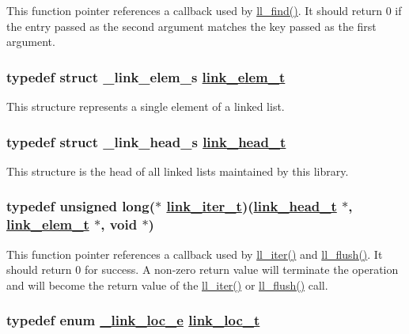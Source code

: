 This function pointer references a callback used by \hyperlink{group__dbprim__link_a9}{ll\_\-find()}. It should return 0 if the entry passed as the second argument matches the key passed as the first argument. \hypertarget{group__dbprim__link_a1}{
\subsubsection[link\_\-elem\_\-t]{\setlength{\rightskip}{0pt plus 5cm}typedef struct \_\-link\_\-elem\_\-s \hyperlink{dbprim_8h_a1}{link\_\-elem\_\-t}}}
\label{group__dbprim__link_a1}


This structure represents a single element of a linked list. \hypertarget{group__dbprim__link_a0}{
\subsubsection[link\_\-head\_\-t]{\setlength{\rightskip}{0pt plus 5cm}typedef struct \_\-link\_\-head\_\-s \hyperlink{dbprim_8h_a0}{link\_\-head\_\-t}}}
\label{group__dbprim__link_a0}


This structure is the head of all linked lists maintained by this library. \hypertarget{group__dbprim__link_a2}{
\subsubsection[link\_\-iter\_\-t]{\setlength{\rightskip}{0pt plus 5cm}typedef unsigned long($\ast$ \hyperlink{dbprim_8h_a2}{link\_\-iter\_\-t})(\hyperlink{dbprim_8h_a0}{link\_\-head\_\-t} $\ast$, \hyperlink{dbprim_8h_a1}{link\_\-elem\_\-t} $\ast$, void $\ast$)}}
\label{group__dbprim__link_a2}


This function pointer references a callback used by \hyperlink{group__dbprim__link_a10}{ll\_\-iter()} and \hyperlink{group__dbprim__link_a11}{ll\_\-flush()}. It should return 0 for success. A non-zero return value will terminate the operation and will become the return value of the \hyperlink{group__dbprim__link_a10}{ll\_\-iter()} or \hyperlink{group__dbprim__link_a11}{ll\_\-flush()} call. \hypertarget{group__dbprim__link_a4}{
\subsubsection[link\_\-loc\_\-t]{\setlength{\rightskip}{0pt plus 5cm}typedef enum \hyperlink{group__dbprim__link_a26}{\_\-link\_\-loc\_\-e} \hyperlink{dbprim_8h_a4}{link\_\-loc\_\-t}}}
\label{group__dbprim__link_a4}


